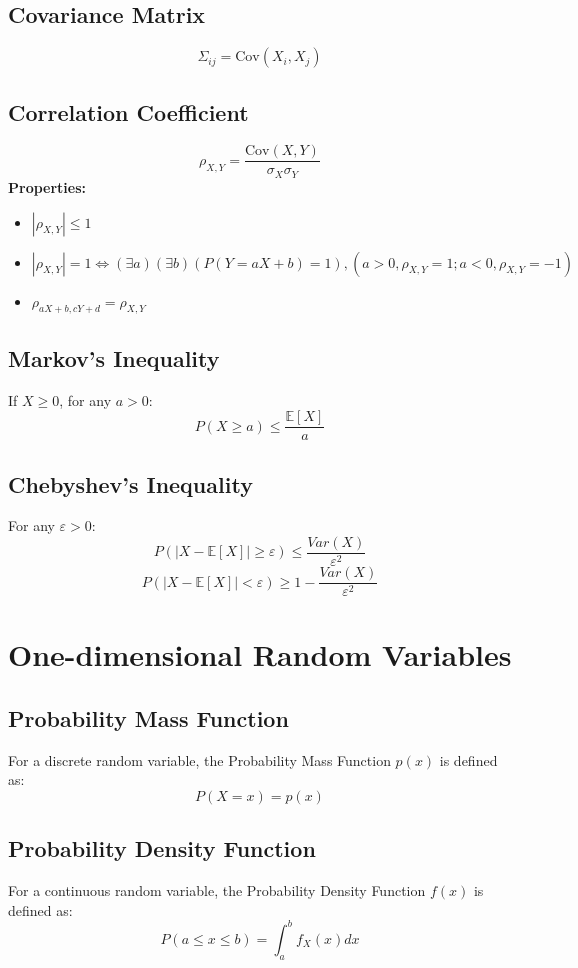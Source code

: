 \documentclass{article}
\begin{document}
\subsection{Covariance Matrix}
\[
    \Sigma_{ij} = \text{Cov}(X_i, X_j)
\]

\subsection{Correlation Coefficient}
\[
    \rho_{X,Y} = \frac{\text{Cov}(X,Y)}{\sigma_X\sigma_Y}
\]
\textbf{Properties:}
\begin{itemize}
    \item \( |\rho_{X,Y}| \le 1 \)
    \item \( |\rho_{X,Y}| = 1 \Leftrightarrow (\exists a)(\exists b)(P(Y=aX+b)=1), (a>0, \rho_{X,Y}=1; a<0, \rho_{X,Y}=-1) \)
    \item \( \rho_{aX + b, cY + d} = \rho_{X,Y} \)
\end{itemize}

\subsection{Markov's Inequality}
If \( X \geq 0 \), for any \( a > 0 \):
\[
    P(X \geq a) \leq \frac{\mathbb{E}[X]}{a}
\]

\subsection{Chebyshev's Inequality}
For any \( \varepsilon > 0 \):
\[
    P(|X-\mathbb{E}[X]| \ge \varepsilon) \le \frac{Var(X)}{\varepsilon^2}
\]
\[
    P(|X-\mathbb{E}[X]| < \varepsilon) \ge 1 - \frac{Var(X)}{\varepsilon^2}
\]

\newpage
\section{One-dimensional Random Variables}

\subsection{Probability Mass Function}
For a discrete random variable, the Probability Mass Function \( p(x) \) is defined as:
\[
    P(X=x) = p(x)
\]

\subsection{Probability Density Function}
For a continuous random variable, the Probability Density Function \( f(x) \) is defined as:
\[
    P(a \le x \le b) = \int_{a}^{b} f_X(x)dx
\]
\end{document}
